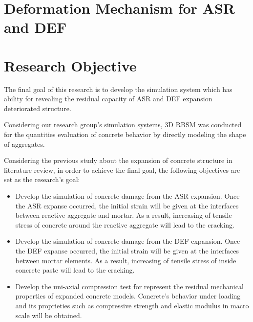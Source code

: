 
\section{Deformation Mechanism for ASR and DEF}


\section{Research Objective}

The final goal of this research is to develop the simulation system which has ability for revealing the residual capacity of ASR and DEF expansion deteriorated structure.

Considering our research group’s simulation systems, 3D RBSM was conducted for the quantities evaluation of concrete behavior by directly modeling the shape of aggregates.

Considering the previous study about the expansion of concrete structure in literature review, in order to achieve the final goal, the following objectives are set as the research’s goal:

\begin{itemize}

    \item Develop the simulation of concrete damage from the ASR expansion. Once the ASR expanse occurred, the initial strain will be given at the interfaces between reactive aggregate and mortar. As a result, increasing of tensile stress of concrete around the reactive aggregate will lead to the cracking.

    \item Develop the simulation of concrete damage from the DEF expansion. Once the DEF expanse occurred, the initial strain will be given at the interfaces between mortar elements. As a result, increasing of tensile stress of inside concrete paste will lead to the cracking.

    \item Develop the uni-axial compression test for represent the residual mechanical properties of expanded concrete models. Concrete's behavior under loading and its proprieties such as compressive strength and elastic modulus in macro scale will be obtained.

\end{itemize}



